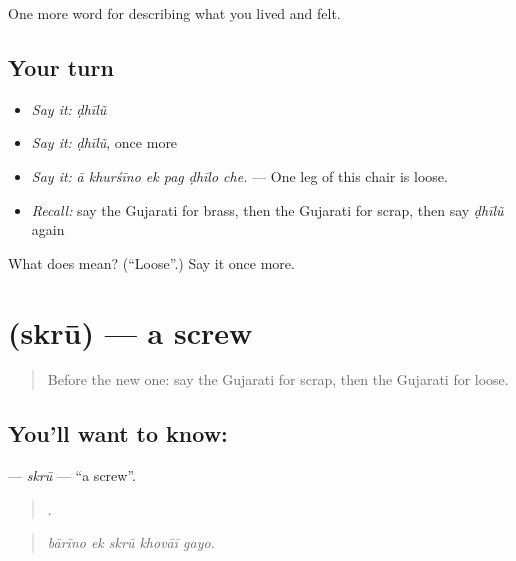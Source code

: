 \begin{grammarlens}[title={What you've built}]
One more word for describing what you lived and felt.
\end{grammarlens}

\subsection*{Your turn}
\begin{itemize}
\raggedright
  \item \emph{Say it:} \emph{ḍhīlũ}
  \item \emph{Say it:} \emph{ḍhīlũ}, once more
  \item \emph{Say it:} \emph{ā khurśīno ek pag ḍhīlo che.} — One leg of this chair is loose.
  \item \emph{Recall:} say the Gujarati for brass, then the Gujarati for scrap, then say \emph{ḍhīlũ} again
\end{itemize}

\begin{tcolorbox}[breakable,colback=teal!4,colframe=teal!35!black,title={Before you move on}]
What does  mean? (\textquotedblleft{}Loose\textquotedblright{}.) Say it once more.
\end{tcolorbox}
\section[\texorpdfstring{\gu{સ્ક્રૂ} (skrū)}{સ્ક્રૂ (skrū)}]{ (skrū) — a screw}

\label{lesson:GU-C514-skru}



\begin{quote}
Before the new one: say the Gujarati for scrap, then the Gujarati for loose.
\end{quote}

\subsection*{You'll want to know: }
\textbf{} — \emph{skrū} — \textquotedblleft{}a screw\textquotedblright{}.

\begin{quote}
    .
\end{quote}

\begin{quote}
\emph{bārīno ek skrū khovāī gayo.}
\end{quote}

